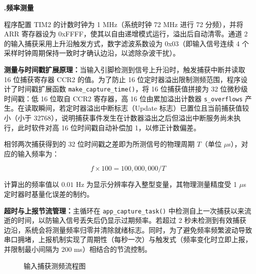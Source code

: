 \documentclass[UTF8,a4paper,zihao=-4,fontset=macnew]{ctexart}
\makeatletter
\def\@extractsubnum#1.#2\@nil{#2}
\newcommand{\subsectiontitle}[2]{%
  \setcounter{subsection}{\numexpr\@extractsubnum#1\@nil-1\relax}\refstepcounter{subsection}%
  \vspace{0.34cm}%
  {\noindent\heiti\bfseries\fontsize{16pt}{18pt}\selectfont #1.\quad #2\par}%
  \vspace{0.54cm}%
}
\makeatother
\begin{document}
\subsectiontitle{4.2}{频率测量}
\label{sec:frequency-measure}

程序配置 TIM2 的计数时钟为 1 MHz（系统时钟 72 MHz 进行 72 分频），并将 ARR 寄存器设为 0xFFFF，使其以自由递增模式运行，溢出后自动清零。通道 2 的输入捕获采用上升沿触发方式，数字滤波系数设为 0x03（即输入信号连续 4 个采样时钟周期保持一致时才确认边沿，以滤除杂波干扰）。

\textbf{测量与时间戳扩展原理：}当输入引脚检测到信号上升沿时，触发捕获中断并读取 16 位捕获寄存器 CCR2 的值。为了防止 16 位定时器溢出限制测频范围，程序设计了时间戳扩展函数 \texttt{make\_capture\_time()}，将 16 位捕获值拼接为 32 位微秒级时间戳：低 16 位取自 CCR2 寄存器，高 16 位由累加溢出计数器 \texttt{s\_overflows} 产生。在读取瞬间，若定时器溢出中断标志（Update 标志）已置位且当前捕获值较小（小于 32768），说明捕获事件发生在计数器溢出之后但溢出中断服务尚未执行，此时软件对高 16 位时间戳自动补偿加 1，以修正计数偏差。

相邻两次捕获得到的 32 位时间戳之差即为所测信号的物理周期 $T$（单位 $\mu$s），对应的输入频率为：

$$f \times 100 = 100{,}000{,}000 / T$$

计算出的频率值以 $0.01$ Hz 为显示分辨率存入整型变量，其物理测量精度受 1 $\mu$s 定时器时基量化误差的制约。

\textbf{超时与上报节流管理：}主循环在 \texttt{app\_capture\_task()} 中检测自上一次捕获以来流逝的时间，以防输入信号丢失后仍显示过期频率。若超过 2 秒未检测到有效捕获边沿，系统会将测量频率归零并清除就绪标志。同时，为了避免频率频繁波动导致串口拥堵，上报机制实现了周期性（每秒一次）与触发式（频率变化时立即上报，并限制最小间隔为 200 ms）相结合的节流控制。

\begin{figure}[H]
\centering
{}
\caption{输入捕获测频流程图}
\label{fig:capture-flow}
\end{figure}
\end{document}
